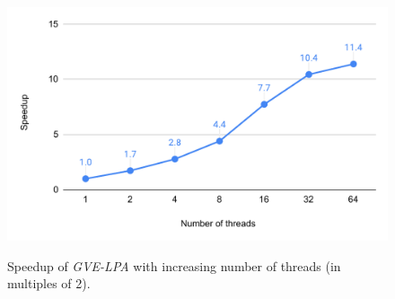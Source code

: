 \begin{figure}[hbtp]
  \centering
  \includegraphics[width=0.98\linewidth]{out/rak-ss.pdf} \\[0ex]
  \caption{Speedup of \textit{GVE-LPA} with increasing number of threads (in multiples of 2).}
  \label{fig:rak-ss}
\end{figure}
